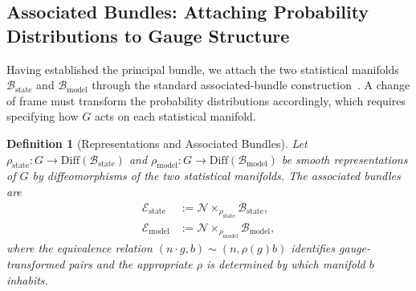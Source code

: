 \documentclass[11pt]{article}
\newtheorem{definition}{Definition}
\begin{document}
\subsection{Associated Bundles: Attaching Probability Distributions to Gauge Structure}

Having established the principal bundle, we attach the two statistical manifolds $\mathcal{B}_{\mathrm{state}}$ and $\mathcal{B}_{\mathrm{model}}$ through the standard associated-bundle construction~\cite{Kobayashi1963, Nakahara2003, frankel2011geometry}. A change of frame must transform the probability distributions accordingly, which requires specifying how $G$ acts on each statistical manifold.

\begin{definition}[Representations and Associated Bundles]
Let $\rho_{\mathrm{state}}: G \to \mathrm{Diff}(\mathcal{B}_{\mathrm{state}})$ and $\rho_{\mathrm{model}}: G \to \mathrm{Diff}(\mathcal{B}_{\mathrm{model}})$ be smooth representations of $G$ by diffeomorphisms of the two statistical manifolds. The associated bundles are
\begin{align}
\mathcal{E}_{\mathrm{state}} &:= \mathcal{N} \times_{\rho_{\mathrm{state}}} \mathcal{B}_{\mathrm{state}}, \\
\mathcal{E}_{\mathrm{model}} &:= \mathcal{N} \times_{\rho_{\mathrm{model}}} \mathcal{B}_{\mathrm{model}},
\end{align}
where the equivalence relation $(n \cdot g, b) \sim (n, \rho(g)b)$ identifies gauge-transformed pairs and the appropriate $\rho$ is determined by which manifold $b$ inhabits.
\end{definition}
\end{document}
